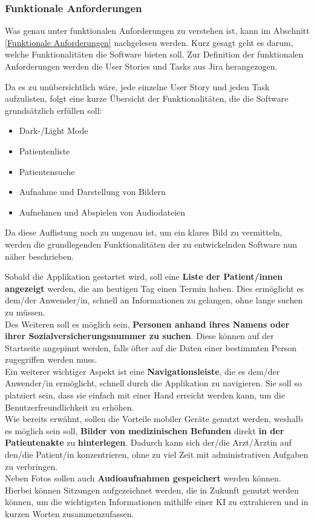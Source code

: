     \subsubsection{Funktionale Anforderungen}
    
    Was genau unter funktionalen Anforderungen zu verstehen ist, kann im Abschnitt \ref{Funktionale Anforderungen} nachgelesen werden.
    Kurz gesagt geht es darum, welche Funktionalitäten die Software bieten soll. Zur Definition der funktionalen Anforderungen werden die User Stories und Tasks aus Jira herangezogen.
    
    Da es zu unübersichtlich wäre, jede einzelne User Story und jeden Task aufzulisten, folgt eine kurze Übersicht der Funktionalitäten, die die Software grundsätzlich erfüllen soll:
    \begin{itemize}
        \item Dark-/Light Mode
        \item Patientenliste
        \item Patientensuche
        \item Aufnahme und Darstellung von Bildern
        \item Aufnehmen und Abspielen von Audiodateien
    \end{itemize}
    
    Da diese Auflistung noch zu ungenau ist, um ein klares Bild zu vermitteln, werden die grundlegenden Funktionalitäten der zu entwickelnden Software nun näher beschrieben.
    
    Sobald die Applikation gestartet wird, soll eine \textbf{Liste der Patient/innen angezeigt} werden, die am heutigen Tag einen Termin haben. Dies ermöglicht es dem/der Anwender/in, schnell an Informationen zu gelangen, ohne lange suchen zu müssen. \\
    Des Weiteren soll es möglich sein, \textbf{Personen anhand ihres Namens oder ihrer Sozialversicherungsnummer zu suchen}. Diese können auf der Startseite angepinnt werden, falls öfter auf die Daten einer bestimmten Person zugegriffen werden muss. \\ 
    Ein weiterer wichtiger Aspekt ist eine \textbf{Navigationsleiste}, die es dem/der Anwender/in ermöglicht, schnell durch die Applikation zu navigieren. Sie soll so platziert sein, dass sie einfach mit einer Hand erreicht werden kann, um die Benutzerfreundlichkeit zu erhöhen. \\
    Wie bereits erwähnt, sollen die Vorteile mobiler Geräte genutzt werden, weshalb es möglich sein soll, \textbf{Bilder von medizinischen Befunden} direkt \textbf{in der Patientenakte} zu \textbf{hinterlegen}. Dadurch kann sich der/die Arzt/Ärztin auf den/die Patient/in konzentrieren, ohne zu viel Zeit mit administrativen Aufgaben zu verbringen. \\
    Neben Fotos sollen auch \textbf{Audioaufnahmen gespeichert} werden können. Hierbei können Sitzungen aufgezeichnet werden, die in Zukunft genutzt werden können, um die wichtigsten Informationen mithilfe einer KI zu extrahieren und in kurzen Worten zusammenzufassen. 


